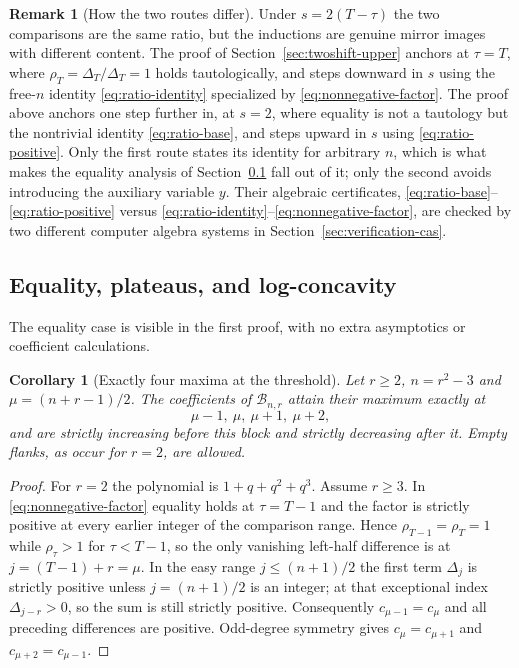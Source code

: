 \documentclass[11pt]{article}
\theoremstyle{research}
\newtheorem{corollary}[theorem]{Corollary}
\theoremstyle{definition}
\newtheorem{remark}[theorem]{Remark}
\newcommand{\TS}{\mathcal B}
\numberwithin{equation}{section}
\begin{document}
\begin{remark}[How the two routes differ]
Under $s=2(T-\tau)$ the two comparisons are the same ratio, but the
inductions are genuine mirror images with different content. The proof of
Section~\ref{sec:twoshift-upper} anchors at $\tau=T$, where
$\rho_T=\Delta_T/\Delta_T=1$ holds tautologically, and steps downward in
$s$ using the free-$n$ identity \eqref{eq:ratio-identity} specialized by
\eqref{eq:nonnegative-factor}. The proof above anchors one step further in,
at $s=2$, where equality is not a tautology but the nontrivial identity
\eqref{eq:ratio-base}, and steps upward in $s$ using
\eqref{eq:ratio-positive}. Only the first route states its identity for
arbitrary $n$, which is what makes the equality analysis of
Section~\ref{sec:twoshift-equality} fall out of it; only the second avoids
introducing the auxiliary variable $y$. Their algebraic certificates,
\eqref{eq:ratio-base}--\eqref{eq:ratio-positive} versus
\eqref{eq:ratio-identity}--\eqref{eq:nonnegative-factor}, are checked by
two different computer algebra systems in
Section~\ref{sec:verification-cas}.
\end{remark}

\subsection{Equality, plateaus, and log-concavity}
\label{sec:twoshift-equality}
The equality case is visible in the first proof, with no extra asymptotics
or coefficient calculations.

\begin{corollary}[Exactly four maxima at the threshold]\label{cor:plateau}
Let $r\ge2$, $n=r^2-3$ and $\mu=(n+r-1)/2$. The coefficients of
$\TS_{n,r}$ attain their maximum exactly at
\begin{equation}\label{eq:four-modes}
 \mu-1,\ \mu,\ \mu+1,\ \mu+2,
\end{equation}
and are strictly increasing before this block and strictly decreasing
after it. Empty flanks, as occur for $r=2$, are allowed.
\end{corollary}
\begin{proof}
For $r=2$ the polynomial is $1+q+q^2+q^3$. Assume $r\ge3$.
In \eqref{eq:nonnegative-factor} equality holds at $\tau=T-1$ and the
factor is strictly positive at every earlier integer of the comparison
range. Hence $\rho_{T-1}=\rho_T=1$ while $\rho_\tau>1$ for $\tau<T-1$, so
the only vanishing left-half difference is at $j=(T-1)+r=\mu$.
In the easy range $j\le(n+1)/2$ the first term $\Delta_j$ is strictly
positive unless $j=(n+1)/2$ is an integer; at that exceptional index
$\Delta_{j-r}>0$, so the sum is still strictly positive.
Consequently $c_{\mu-1}=c_\mu$ and all preceding differences are positive.
Odd-degree symmetry gives $c_\mu=c_{\mu+1}$ and $c_{\mu+2}=c_{\mu-1}$.
\end{proof}
\end{document}
